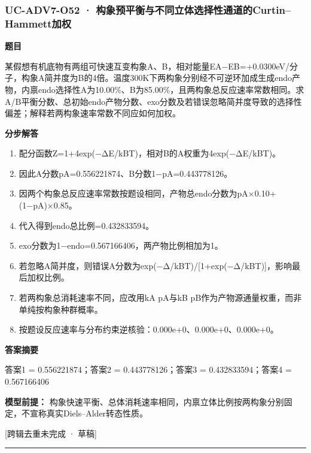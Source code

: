\documentclass[UTF8,11pt,a4paper]{ctexart}
\begin{document}
\subsubsection*{UC-ADV7-O52 · 构象预平衡与不同立体选择性通道的Curtin–Hammett加权}
\noindent\textbf{题目}\par
某假想有机底物有两组可快速互变构象A、B，相对能量EA−EB=+0.0300eV/分子，构象A简并度为B的4倍。温度300K下两构象分别经不可逆环加成生成endo产物，内禀endo选择性A为10.00\%、B为85.00\%，且两构象总反应速率常数相同。求A/B平衡分数、总初始endo产物分数、exo分数及若错误忽略简并度导致的选择性偏差；解释若两构象速率常数不同应如何加权。\par
\medskip\noindent\textbf{分步解答}
\begin{enumerate}
\item 配分函数Z=1+4exp(−ΔE/kBT)，相对B的A权重为4exp(−ΔE/kBT)。
\item 因此A分数pA=0.556221874、B分数1−pA=0.443778126。
\item 因两个构象总反应速率常数按题设相同，产物总endo分数为pA×0.10+(1−pA)×0.85。
\item 代入得到endo总比例=0.432833594。
\item exo分数为1−endo=0.567166406，两产物比例相加为1。
\item 若忽略A简并度，则错误A分数为exp(−Δ/kBT)/[1+exp(−Δ/kBT)]，影响最后加权比例。
\item 若两构象总消耗速率不同，应改用kA pA与kB pB作为产物源通量权重，而非单纯按构象种群概率。
\item 按题设反应速率与分布约束逆核验：0.000e+0、0.000e+0、0.000e+0。
\end{enumerate}
\noindent\textbf{答案摘要}\par
答案1 = 0.556221874；答案2 = 0.443778126；答案3 = 0.432833594；答案4 = 0.567166406\par
\noindent\textbf{模型前提：}
构象快速平衡、总体消耗速率相同，内禀立体比例按两构象分别固定，不宣称真实Diels–Alder转态性质。\par
\noindent\textcolor{red!65!black}{[跨辑去重未完成 · 草稿]} \par
\medskip\hrule\medskip
{}
\end{document}
